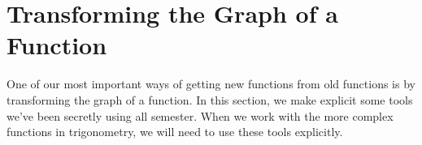 \section{Transforming the Graph of a Function} 
One of our most important ways of getting new functions from old functions is by transforming the graph of a function. In this section, we make explicit some tools we've been secretly using all semester. When we work with the more complex functions in trigonometry, we will need to use these tools explicitly.

 
 
 
 
 
 
 
 
 
 
 
